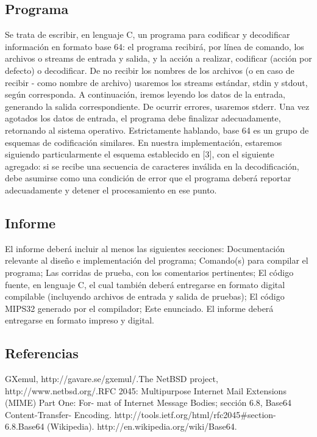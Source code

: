 \documentclass{article}
\begin{document}
\subsection{Programa}
Se trata de escribir, en lenguaje C, un programa para codificar y decodificar
información en formato base 64: el programa recibirá, por línea de comando, los archivos o streams de entrada y salida, y la acción a realizar, codificar (acción por defecto) o decodificar. De no recibir los nombres de los archivos (o
en caso de recibir - como nombre de archivo) usaremos los streams estándar,
stdin y stdout, según corresponda. A continuación, iremos leyendo los datos
de la entrada, generando la salida correspondiente. De ocurrir errores, usaremos stderr. Una vez agotados los datos de entrada, el programa debe finalizar
adecuadamente, retornando al sistema operativo.
Estrictamente hablando, base 64 es un grupo de esquemas de codificación
similares. En nuestra implementación, estaremos siguiendo particularmente el
esquema establecido en [3], con el siguiente agregado: si se recibe una secuencia
de caracteres inválida en la decodificación, debe asumirse como una condición
de error que el programa deberá reportar adecuadamente y detener el procesamiento en ese punto.

\subsection{Informe}
El informe deberá incluir al menos las siguientes secciones:
Documentación relevante al diseño e implementación del programa;
Comando(s) para compilar el programa;
Las corridas de prueba, con los comentarios pertinentes;
El código fuente, en lenguaje C, el cual también deberá entregarse en
formato digital compilable (incluyendo archivos de entrada y salida de
pruebas);
El código MIPS32 generado por el compilador;
Este enunciado.
El informe deberá entregarse en formato impreso y digital.

\subsection{Referencias}
\begin{flushleft}
[1] GXemul, http://gavare.se/gxemul/.\break
[2] The NetBSD project, http://www.netbsd.org/.\break
[3] RFC 2045: Multipurpose Internet Mail Extensions (MIME) Part One: For-
mat of Internet Message Bodies; sección 6.8, Base64 Content-Transfer-
Encoding. http://tools.ietf.org/html/rfc2045\#section-6.8.\break
[4] Base64 (Wikipedia). http://en.wikipedia.org/wiki/Base64.
\end{flushleft}
\end{document}
